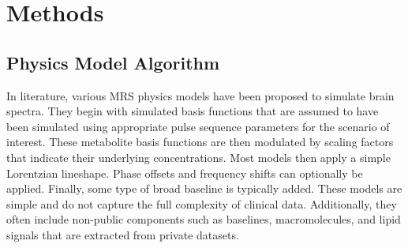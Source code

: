 \section{Methods}\label{sec:Methods}
\subsection{Physics Model Algorithm}
In literature, various MRS physics models have been proposed to simulate brain spectra. They begin with simulated basis functions that are assumed to have been simulated using appropriate pulse sequence parameters for the scenario of interest. These metabolite basis functions are then modulated by scaling factors that indicate their underlying concentrations. Most models then apply a simple Lorentzian lineshape.\cite{Hatami, Das2018a, Das2018} Phase offsets\cite{Das2018,Iqbal2018a} and frequency shifts\cite{Hatami} can optionally be applied. Finally, some type of broad baseline is typically added. These models are simple and do not capture the full complexity of clinical data. Additionally, they often include non-public components such as baselines, macromolecules, and lipid signals that are extracted from private datasets.

